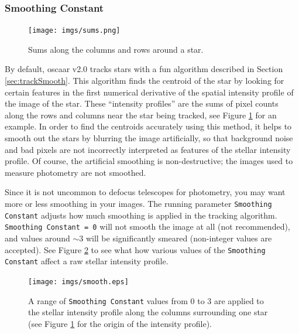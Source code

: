\documentclass[a4paper]{article}
\newcommand{\code}[1]{\texttt{#1}}
\begin{document}
\subsubsection{Smoothing Constant} \label{sec:smoothingconst}
\begin{figure}[H]
\begin{center}
\texttt{[image: imgs/sums.png]}
\caption{Sums along the columns and rows around a star.}
\label{fig:sumsExample}
\end{center}	
\end{figure}
By default, oscaar v2.0 tracks stars with a fun algorithm described in Section \ref{sec:trackSmooth}. This algorithm finds the centroid of the star by looking for certain features in the first numerical derivative of the spatial intensity profile of the image of the star. These ``intensity profiles'' are the sums of pixel counts along the rows and columns near the star being tracked, see Figure \ref{fig:sumsExample} for an example. In order to find the centroids accurately using this method, it helps to smooth out the stars by blurring the image artificially, so that background noise and bad pixels are not incorrectly  interpreted as features of the stellar intensity profile. Of course, the artificial smoothing is non-destructive; the images used to measure photometry are not smoothed. 

Since it is not uncommon to defocus telescopes for photometry, you may want more or less smoothing in your images. The running parameter \code{Smoothing Constant} adjusts how much smoothing is applied in the tracking algorithm. \code{Smoothing Constant = 0} will not smooth the image at all (not recommended), and values around $\sim3$ will be significantly smeared (non-integer values are accepted). See Figure \ref{fig:smoothExample} to see what how various values of the \code{Smoothing Constant} affect a raw stellar intensity profile.
\begin{figure}[H]
\begin{center}
\texttt{[image: imgs/smooth.eps]}
\caption{A range of \code{Smoothing Constant} values from 0 to 3 are applied to the stellar intensity profile along the columns surrounding one star (see Figure \ref{fig:sumsExample} for the origin of the intensity profile).}
\label{fig:smoothExample}
\end{center}	
\end{figure}
\end{document}
